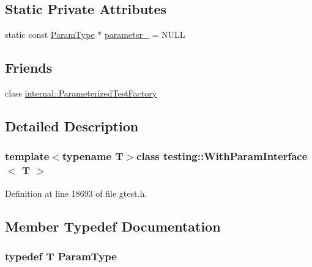 \subsection*{\-Static \-Private \-Attributes}
\begin{DoxyCompactItemize}
\item 
static const \hyperlink{classtesting_1_1WithParamInterface_a1c17d95e5946c3f940ece2bd9165fc34}{\-Param\-Type} $\ast$ \hyperlink{classtesting_1_1WithParamInterface_a2e61fb23c84a146a99fafc9247201db5}{parameter\-\_\-} = \-N\-U\-L\-L
\end{DoxyCompactItemize}
\subsection*{\-Friends}
\begin{DoxyCompactItemize}
\item 
class \hyperlink{classtesting_1_1WithParamInterface_ae0612e50a89438cfe317ed6daaa78cfa}{internal\-::\-Parameterized\-Test\-Factory}
\end{DoxyCompactItemize}


\subsection{\-Detailed \-Description}
\subsubsection*{template$<$typename \-T$>$class testing\-::\-With\-Param\-Interface$<$ T $>$}



\-Definition at line 18693 of file gtest.\-h.



\subsection{\-Member \-Typedef \-Documentation}
\hypertarget{classtesting_1_1WithParamInterface_a1c17d95e5946c3f940ece2bd9165fc34}{
\subsubsection[{\-Param\-Type}]{\setlength{\rightskip}{0pt plus 5cm}typedef \-T {\bf \-Param\-Type}}}\label{d5/d86/classtesting_1_1WithParamInterface_a1c17d95e5946c3f940ece2bd9165fc34}


